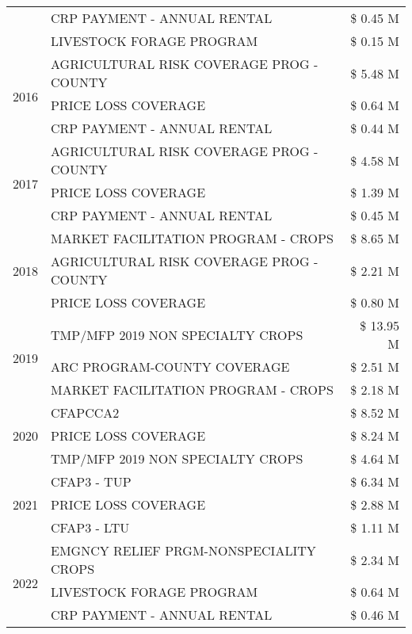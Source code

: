 \begin{tabular}{llr}
 & CRP PAYMENT - ANNUAL RENTAL & \$ 0.45 M \\
 & LIVESTOCK FORAGE PROGRAM & \$ 0.15 M \\
\cline{1-3}
\multirow[t]{3}{*}{2016} & AGRICULTURAL RISK COVERAGE PROG - COUNTY & \$ 5.48 M \\
 & PRICE LOSS COVERAGE & \$ 0.64 M \\
 & CRP PAYMENT - ANNUAL RENTAL & \$ 0.44 M \\
\cline{1-3}
\multirow[t]{3}{*}{2017} & AGRICULTURAL RISK COVERAGE PROG - COUNTY & \$ 4.58 M \\
 & PRICE LOSS COVERAGE & \$ 1.39 M \\
 & CRP PAYMENT - ANNUAL RENTAL & \$ 0.45 M \\
\cline{1-3}
\multirow[t]{3}{*}{2018} & MARKET FACILITATION PROGRAM - CROPS & \$ 8.65 M \\
 & AGRICULTURAL RISK COVERAGE PROG - COUNTY & \$ 2.21 M \\
 & PRICE LOSS COVERAGE & \$ 0.80 M \\
\cline{1-3}
\multirow[t]{3}{*}{2019} & TMP/MFP 2019 NON SPECIALTY CROPS & \$ 13.95 M \\
 & ARC PROGRAM-COUNTY COVERAGE & \$ 2.51 M \\
 & MARKET FACILITATION PROGRAM - CROPS & \$ 2.18 M \\
\cline{1-3}
\multirow[t]{3}{*}{2020} & CFAPCCA2 & \$ 8.52 M \\
 & PRICE LOSS COVERAGE & \$ 8.24 M \\
 & TMP/MFP 2019 NON SPECIALTY CROPS & \$ 4.64 M \\
\cline{1-3}
\multirow[t]{3}{*}{2021} & CFAP3 - TUP & \$ 6.34 M \\
 & PRICE LOSS COVERAGE & \$ 2.88 M \\
 & CFAP3 - LTU & \$ 1.11 M \\
\cline{1-3}
\multirow[t]{3}{*}{2022} & EMGNCY RELIEF PRGM-NONSPECIALITY CROPS & \$ 2.34 M \\
 & LIVESTOCK FORAGE PROGRAM & \$ 0.64 M \\
 & CRP PAYMENT - ANNUAL RENTAL & \$ 0.46 M \\
\cline{1-3}
\bottomrule
\end{tabular}
